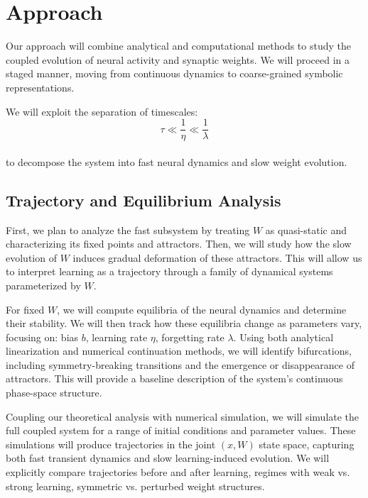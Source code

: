 \documentclass{article}
\begin{document}
\section*{Approach}
Our approach will combine analytical and computational methods to study the coupled evolution of neural activity and synaptic weights. We will proceed in a staged manner, moving from continuous dynamics to coarse-grained symbolic representations.

We will exploit the separation of timescales:
\begin{equation}
    \tau \ll \frac{1}{\eta} \ll \frac{1}{\lambda}
\end{equation}
\\
to decompose the system into fast neural dynamics and slow weight evolution. 

\subsection*{Trajectory and Equilibrium Analysis}
First, we plan to analyze the fast subsystem by treating $W$ as quasi-static and characterizing its fixed points and attractors. Then, we will study how the slow evolution of $W$ induces gradual deformation of these attractors. This will allow us to interpret learning as a trajectory through a family of dynamical systems parameterized by $W$.

For fixed $W$, we will compute equilibria of the neural dynamics and determine their stability. We will then track how these equilibria change as parameters vary, focusing on: bias $b$, learning rate $\eta$, forgetting rate $\lambda$. Using both analytical linearization and numerical continuation methods, we will identify bifurcations, including symmetry-breaking transitions and the emergence or disappearance of attractors. This will provide a baseline description of the system's continuous phase-space structure.

Coupling our theoretical analysis with numerical simulation, we will simulate the full coupled system for a range of initial conditions and parameter values. These simulations will produce trajectories in the joint $(x, W)$ state space, capturing both fast transient dynamics and slow learning-induced evolution. We will explicitly compare trajectories before and after learning, regimes with weak vs. strong learning, symmetric vs. perturbed weight structures.
\end{document}
